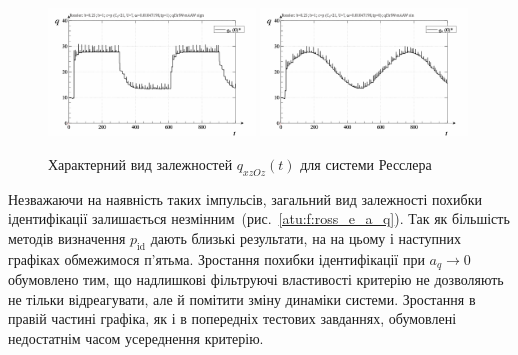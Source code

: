 \begin{figure}[ht!]
\begin{center}
  \includegraphics[width=0.49\textwidth]{p/cha/ross/ross_id-p_t_q_ql3rlWvnAAW_sign.png}
  \hfill
  \includegraphics[width=0.49\textwidth]{p/cha/ross/ross_id-p_t_q_ql3rlWvnAAW_sin.png}
\end{center}
\caption{Характерний вид залежностей $ q_{xzOz} (t) $ для системи Ресслера}
\label{atu:f:ross_q_t}
\end{figure}

Незважаючи на наявність таких імпульсів, загальний
вид залежності похибки ідентифікації залишається
незмінним~(рис.~\ref{atu:f:ross_e_a_q}).
Так як більшість методів визначення
$ p_\mathrm{id} $ дають близькі результати, на на цьому і наступних
графіках обмежимося п'ятьма. Зростання похибки ідентифікації
при
$ a_q \to 0 $ обумовлено тим, що надлишкові фільтруючі властивості
критерію не дозволяють не тільки відреагувати, але й помітити
зміну динаміки системи. Зростання в правій частині графіка,
як і в попередніх тестових завданнях, обумовлені недостатнім
часом усереднення критерію.

